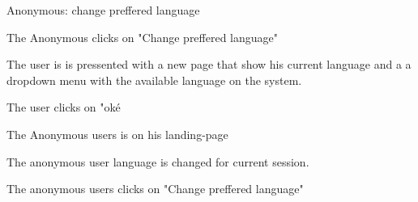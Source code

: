 \begin{uc}{Anonymous: change preffered language}

    \begin{uc-mss}
    \item The Anonymous clicks on "Change preffered language"
    \item The user is is pressented with a new page that show his current language and a a dropdown menu with the available language on the system.
    \item The user clicks on "oké 
    \end{uc-mss}
        \begin{uc-pre}
        \item The Anonymous users is on his landing-page
        \end{uc-pre}

        \begin{uc-post}
        \item The anonymous user language is changed for current session.
        \end{uc-post}

        \begin{uc-trig}
        \item The anonymous users clicks on "Change preffered language"
        \end{uc-trig}
\end{uc}